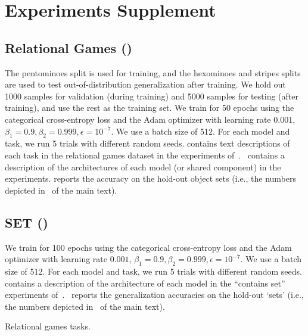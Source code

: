 \section{Experiments Supplement}\label{sec:experiments_supplement}

\subsection{Relational Games ()}

The pentominoes split is used for training, and the hexominoes and stripes splits are used to test out-of-distribution generalization after training. We hold out 1000 samples for validation (during training) and 5000 samples for testing (after training), and use the rest as the training set. We train for 50 epochs using the categorical cross-entropy loss and the Adam optimizer with learning rate $0.001$, $\beta_1 = 0.9, \beta_2 = 0.999, \epsilon = 10^{-7}$. We use a batch size of 512. For each model and task, we run 5 trials with different random seeds. contains text descriptions of each task in the relational games dataset in the experiments of~.~ contains a description of the architectures of each model (or shared component) in the experiments.
 reports the accuracy on the hold-out object sets (i.e., the numbers depicted in~ of the main text).

\subsection{SET ()}

We train for 100 epochs using the categorical cross-entropy loss and the Adam optimizer with learning rate $0.001$, $\beta_1 = 0.9, \beta_2 = 0.999, \epsilon = 10^{-7}$. We use a batch size of 512. For each model and task, we run 5 trials with different random seeds. contains a description of the architecture of each model in the ``contains set'' experiments of~.~ reports the generalization accuracies on the hold-out `sets' (i.e., the numbers depicted in~ of the main text).

\begin{table}[H]
    \centering
    
    \caption{Relational games tasks.}\label{tab:relational_games_tasks}
\end{table}


